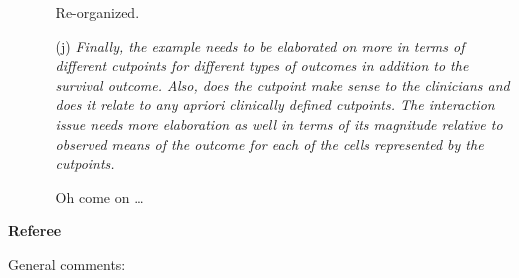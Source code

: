\documentclass[11pt,a4paper]{article}
\begin{document}
\begin{enumerate}
\begin{itemize}
	       Re-organized.
	       
    \item[(j)] \textit{Finally, the example needs to be elaborated on more in terms
               of different cutpoints for different types of outcomes in addition to
	       the survival outcome. Also, does the cutpoint make sense to the
	       clinicians and does it relate to any apriori clinically defined
	       cutpoints. The interaction issue needs more elaboration as well in
	       terms of its magnitude relative to observed means of the outcome for
	       each of the cells represented by the cutpoints.}
	       
	       Oh come on \dots

  \end{itemize}
  
\end{enumerate}

\textbf{\large Referee}

General comments:
\end{document}
